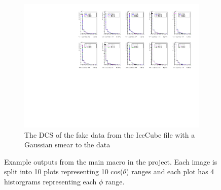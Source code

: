 \documentclass[12pt]{article}
\numberwithin{equation}{section}
\numberwithin{figure}{section}
\begin{document}
\begin{figure}
\begin{subfigure}{0.8\textwidth}
                \includegraphics[scale=0.59]{MCUnfSmearing}
                \caption{The DCS of the fake data from the IceCube file with a Gaussian smear to the data}
                \label{fig:output_smear}
    \end{subfigure}
	\caption{Example outputs from the main macro in the project. Each image is split into 10 plots representing 10 cos($\theta$) ranges and each plot has 4 historgrams representing each $\phi$ range.}
	\label{fig:outputs}
\end{figure}
\end{document}
